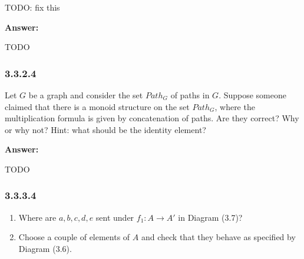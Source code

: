 \documentclass{article}
\newcommand{\vsp}[0]{\vspace*{10pt}\par}
\newcommand{\exercise}[1]{\subsubsection*{#1}}
\newcommand{\ans}[0]{\vsp\textbf{Answer: }\vsp}
\newcommand{\ei}{\item}
\newcommand{\es}{\begin{enumerate}[label=(\alph*)]\ei}
\newcommand{\ee}{\end{enumerate}}
\begin{document}
TODO: fix this

\ans

TODO

\exercise{3.3.2.4}

Let $G$ be a graph and consider the set $Path_G$ of paths in $G$. Suppose
someone claimed that there is a monoid structure on the set $Path_G$, where the
multiplication formula is given by concatenation of paths. Are they correct? Why
or why not? Hint: what should be the identity element?


\ans

TODO

\exercise{3.3.3.4}

\es Where are $a, b, c, d, e$ sent under $f_1 : A \to A'$ in Diagram (3.7)?
\ei Choose a couple of elements of $A$ and check that they behave as specified
    by Diagram (3.6).
\ee


\vsp
\vsp
\vsp
\vsp

\printbibliography
\end{document}
